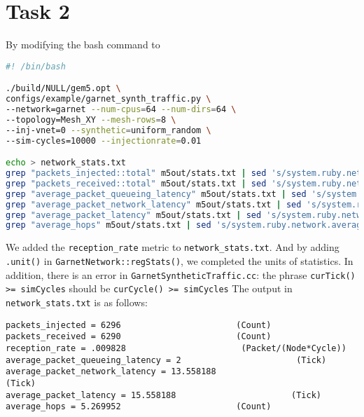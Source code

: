 \documentclass{article}
\begin{document}
\section*{Task 2}
By modifying the bash command to
\begin{lstlisting}[language=bash]
#! /bin/bash

./build/NULL/gem5.opt \
configs/example/garnet_synth_traffic.py \
--network=garnet --num-cpus=64 --num-dirs=64 \
--topology=Mesh_XY --mesh-rows=8 \
--inj-vnet=0 --synthetic=uniform_random \
--sim-cycles=10000 --injectionrate=0.01 

echo > network_stats.txt
grep "packets_injected::total" m5out/stats.txt | sed 's/system.ruby.network.packets_injected::total\s*/packets_injected = /' >> network_stats.txt
grep "packets_received::total" m5out/stats.txt | sed 's/system.ruby.network.packets_received::total\s*/packets_received = /' >> network_stats.txt
grep "average_packet_queueing_latency" m5out/stats.txt | sed 's/system.ruby.network.average_packet_queueing_latency\s*/average_packet_queueing_latency = /' >> network_stats.txt
grep "average_packet_network_latency" m5out/stats.txt | sed 's/system.ruby.network.average_packet_network_latency\s*/average_packet_network_latency = /' >> network_stats.txt
grep "average_packet_latency" m5out/stats.txt | sed 's/system.ruby.network.average_packet_latency\s*/average_packet_latency = /' >> network_stats.txt
grep "average_hops" m5out/stats.txt | sed 's/system.ruby.network.average_hops\s*/average_hops = /' >> network_stats.txt
\end{lstlisting}
We added the \verb|reception_rate| metric to \verb|network_stats.txt|. And by adding \verb|.unit()| in \verb|GarnetNetwork::regStats()|, we completed the units of statistics. In addition, there is an error in \verb|GarnetSyntheticTraffic.cc|: the phrase \verb|curTick() >= simCycles| should be \verb|curCycle() >= simCycles| The output in \verb|network_stats.txt| is as follows:
\begin{lstlisting}[language={}]
packets_injected = 6296                       (Count)
packets_received = 6290                       (Count)
reception_rate = .009828                       (Packet/(Node*Cycle))
average_packet_queueing_latency = 2                       (Tick)
average_packet_network_latency = 13.558188                       (Tick)
average_packet_latency = 15.558188                       (Tick)
average_hops = 5.269952                       (Count)
\end{lstlisting}
\end{document}
